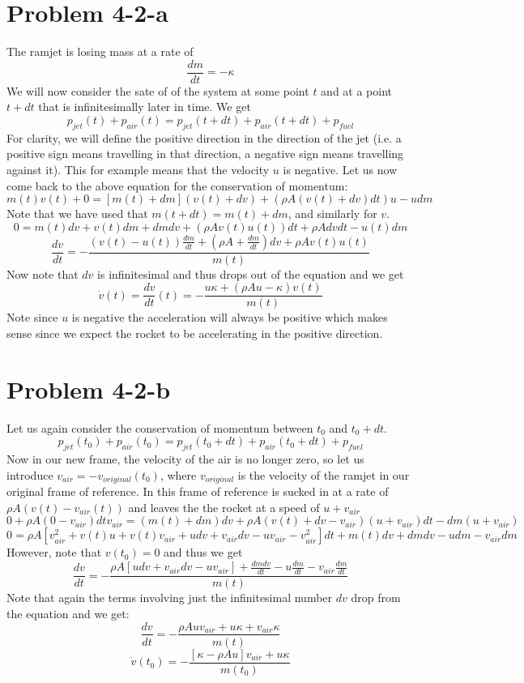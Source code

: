\section*{Problem 4-2-a}
The ramjet is losing mass at a rate of 
\[ \frac{dm}{dt} = -\kappa\]
We will now consider the sate of of the system at some point $t$ and at a point $t+dt$ that is infinitesimally later in time. We get
\[ p_{jet}(t) + p_{air}(t) = p_{jet}(t+dt)+p_{air}(t+dt) + p_{fuel}\]
For clarity, we will define the positive direction in the direction of the jet (i.e. a positive sign means travelling in that direction, a negative sign means travelling against it). This for example means that the velocity $u$ is negative. Let us now come back to the above equation for the conservation of momentum:
\[ m(t)v(t)+0=\left[m(t)+dm \right](v(t)+dv) + (\rho A (v(t)+dv) dt)u-u dm \]
Note that we have used that $m(t+dt)=m(t)+dm$, and similarly for $v$.
\[ 0 = m(t)dv + v(t) dm + dmdv + (\rho A v(t) u(t))dt + \rho A dvdt -  u(t)dm \]
\[ \frac{dv}{dt} = -\dfrac{(v(t)-u(t))\frac{dm}{dt} + (\rho A + \frac{dm}{dt})dv + \rho A v(t)u(t) }{m(t)} \]
Now note that $dv$ is infinitesimal and thus drops out of the equation and we get
\[ \dot{v}(t) = \frac{dv}{dt}(t)= -\dfrac{u\kappa +(\rho A u -\kappa )v(t)}{m(t)} \]
Note since $u$ is negative the acceleration will always be positive which makes sense since we expect the rocket to be accelerating in the positive direction.
\section*{Problem 4-2-b}
Let us again consider the conservation of momentum between $t_0$ and $t_0+dt$. 
\[ p_{jet}(t_0) + p_{air}(t_0) = p_{jet}(t_0+dt)+p_{air}(t_0+dt) + p_{fuel} \]
Now in our new frame, the velocity of the air is no longer zero, so let us introduce $v_{air} = -v_{original}(t_0)$, where $v_{original}$ is the velocity of the ramjet in our original frame of reference. In this frame of reference is sucked in at a rate of $\rho A(v(t)-v_{air}(t))$ and leaves the the rocket at a speed of $u+v_{air}$
\[ 0 + \rho A(0-v_{air})dt v_{air} = (m(t)+dm)dv + \rho A(v(t)+dv-v_{air})(u+v_{air})dt -dm(u+v_{air}) \]
\[ 0 = \rho A[ v^2_{air} + v(t)u + v(t)v_{air} + udv + v_{air}dv - uv_{air} - v^2_{air} ]dt + m(t)dv + dmdv - udm - v_{air}dm  \]
However, note that $v(t_0)=0$ and thus we get
\[ \frac{dv}{dt} = -\dfrac{\rho A[ udv + v_{air}dv - uv_{air}  ] + \frac{dmdv}{dt} - u\frac{dm}{dt} - v_{air}\frac{dm}{dt}}{m(t)} \]
Note that again the terms involving just the infinitesimal number $dv$ drop from the equation and we get:
\[ \frac{dv}{dt} = -\dfrac{\rho Auv_{air} +  u\kappa + v_{air}\kappa}{m(t)}  \]
\[ \dot{v}(t_0) = -\dfrac{[\kappa -\rho Au]v_{air} +  u\kappa}{m(t_0)} \]
